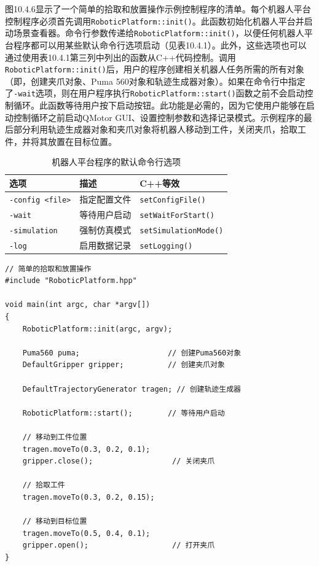 \documentclass[UTF8,a4paper,12pt]{ctexart}
\begin{document}
图10.4.6显示了一个简单的拾取和放置操作示例控制程序的清单。每个机器人平台控制程序必须首先调用\texttt{RoboticPlatform::init()}。此函数初始化机器人平台并启动场景查看器。命令行参数传递给\texttt{RoboticPlatform::init()}，以便任何机器人平台程序都可以用某些默认命令行选项启动（见表10.4.1）。此外，这些选项也可以通过使用表10.4.1第三列中列出的函数从C++代码控制。调用\texttt{RoboticPlatform::init()}后，用户的程序创建相关机器人任务所需的所有对象（即，创建夹爪对象、Puma 560对象和轨迹生成器对象）。如果在命令行中指定了\texttt{-wait}选项，则在用户程序执行\texttt{RoboticPlatform::start()}函数之前不会启动控制循环。此函数等待用户按下启动按钮。此功能是必需的，因为它使用户能够在启动控制循环之前启动QMotor GUI、设置控制参数和选择记录模式。示例程序的最后部分利用轨迹生成器对象和夹爪对象将机器人移动到工件，关闭夹爪，拾取工件，并将其放置在目标位置。

\begin{table}[htbp]
\centering
\caption{机器人平台程序的默认命令行选项}
\label{tab:10.4.1}
\begin{tabular}{lll}
\toprule
\textbf{选项} & \textbf{描述} & \textbf{C++等效} \\
\midrule
\texttt{-config <file>} & 指定配置文件 & \texttt{setConfigFile()} \\
\texttt{-wait} & 等待用户启动 & \texttt{setWaitForStart()} \\
\texttt{-simulation} & 强制仿真模式 & \texttt{setSimulationMode()} \\
\texttt{-log} & 启用数据记录 & \texttt{setLogging()} \\
\bottomrule
\end{tabular}
\end{table}

\begin{lstlisting}[caption={简单的拾取和放置程序},label={lst:pickplace}]
// 简单的拾取和放置操作
#include "RoboticPlatform.hpp"

void main(int argc, char *argv[])
{
    RoboticPlatform::init(argc, argv);

    Puma560 puma;                    // 创建Puma560对象
    DefaultGripper gripper;          // 创建夹爪对象

    DefaultTrajectoryGenerator tragen; // 创建轨迹生成器

    RoboticPlatform::start();        // 等待用户启动

    // 移动到工件位置
    tragen.moveTo(0.3, 0.2, 0.1);
    gripper.close();                  // 关闭夹爪

    // 拾取工件
    tragen.moveTo(0.3, 0.2, 0.15);

    // 移动到目标位置
    tragen.moveTo(0.5, 0.4, 0.1);
    gripper.open();                   // 打开夹爪
}
\end{lstlisting}
\end{document}
